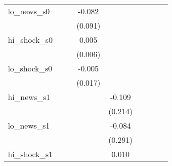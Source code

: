 {\begin{tabular}{l*{8}{c}}
\addlinespace
lo\_news\_s0  &                     &                     &      -0.082         &                     &                     &                     &                     &                     \\
            &                     &                     &     (0.091)         &                     &                     &                     &                     &                     \\
\addlinespace
hi\_shock\_s0 &                     &                     &       0.005         &                     &                     &                     &                     &                     \\
            &                     &                     &     (0.006)         &                     &                     &                     &                     &                     \\
\addlinespace
lo\_shock\_s0 &                     &                     &      -0.005         &                     &                     &                     &                     &                     \\
            &                     &                     &     (0.017)         &                     &                     &                     &                     &                     \\
\addlinespace
hi\_news\_s1  &                     &                     &                     &      -0.109         &                     &                     &                     &                     \\
            &                     &                     &                     &     (0.214)         &                     &                     &                     &                     \\
\addlinespace
lo\_news\_s1  &                     &                     &                     &      -0.084         &                     &                     &                     &                     \\
            &                     &                     &                     &     (0.291)         &                     &                     &                     &                     \\
\addlinespace
hi\_shock\_s1 &                     &                     &                     &       0.010\sym{*}  &                     &                     &                     &                     \\

\end{tabular}}

